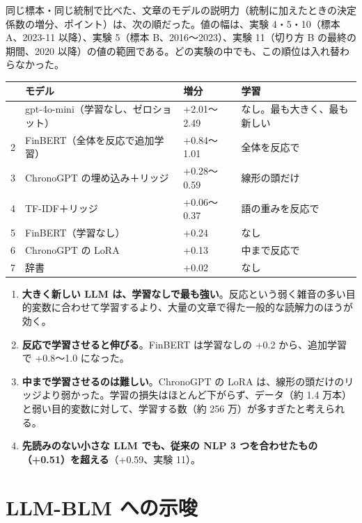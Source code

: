 同じ標本・同じ統制で比べた、文章のモデルの説明力（統制に加えたときの決定係数の増分、ポイント）は、次の順だった。値の幅は、実験 4・5・10（標本 A、2023-11 以降）、実験 5（標本 B、2016〜2023）、実験 11（切り方 B の最終の期間、2020 以降）の値の範囲である。どの実験の中でも、この順位は入れ替わらなかった。

\begin{longtable}{P{0.6cm}P{5.6cm}P{2.0cm}P{6.2cm}}
\toprule
 & \textbf{モデル} & \textbf{増分} & \textbf{学習} \\
\midrule
\endhead
\bottomrule
{} & gpt-4o-mini（学習なし、ゼロショット） & +2.01〜2.49 & なし。最も大きく、最も新しい \\
2 & FinBERT（全体を反応で追加学習） & +0.84〜1.01 & 全体を反応で \\
3 & ChronoGPT の埋め込み＋リッジ & +0.28〜0.59 & 線形の頭だけ \\
4 & TF-IDF＋リッジ & +0.06〜0.37 & 語の重みを反応で \\
5 & FinBERT（学習なし） & +0.24 & なし \\
6 & ChronoGPT の LoRA & +0.13 & 中まで反応で \\
7 & 辞書 & +0.02 & なし \\
\end{longtable}

\begin{keybox}[順位から読めること]
\begin{enumerate}
\item \textbf{大きく新しい LLM は、学習なしで最も強い}。反応という弱く雑音の多い目的変数に合わせて学習するより、大量の文章で得た一般的な読解力のほうが効く。
\item \textbf{反応で学習させると伸びる}。FinBERT は学習なしの +0.2 から、追加学習で +0.8〜1.0 になった。
\item \textbf{中まで学習させるのは難しい}。ChronoGPT の LoRA は、線形の頭だけのリッジより弱かった。学習の損失はほとんど下がらず、データ（約 1.4 万本）と弱い目的変数に対して、学習する数（約 256 万）が多すぎたと考えられる。
\item \textbf{先読みのない小さな LLM でも、従来の NLP 3 つを合わせたもの（+0.51）を超える}（+0.59、実験 11）。
\end{enumerate}
\end{keybox}

\section{LLM-BLM への示唆}

